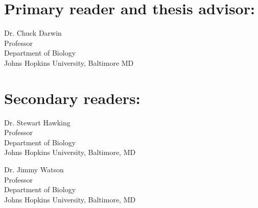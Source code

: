 

\Blindtext[3]




\begin{singlespace}

\section*{Primary reader and thesis advisor:}

Dr. Chuck Darwin \\
Professor\\
Department of Biology\\
Johns Hopkins University, Baltimore MD 



\section*{Secondary readers:}

Dr. Stewart Hawking\\
Professor\\
Department of Biology \\
Johns Hopkins University, Baltimore, MD 

\vspace{0.1in}

Dr. Jimmy Watson \\
Professor\\
Department of Biology \\
Johns Hopkins University, Baltimore, MD 


\end{singlespace}